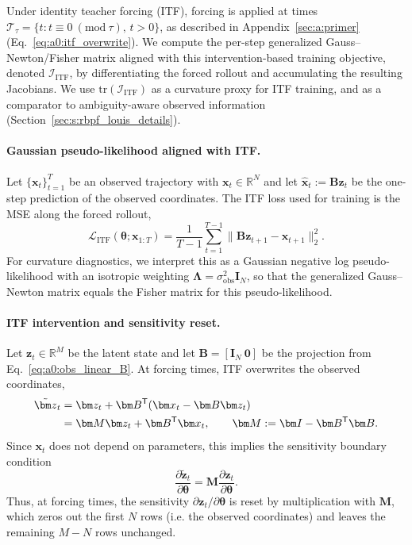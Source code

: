 \documentclass[twoside]{article}
\theoremstyle{plain}
\theoremstyle{definition}
\theoremstyle{remark}
\newcommand{\tr}{\mathrm{tr}}
\begin{document}
Under identity teacher forcing (ITF), forcing is applied at times $\mathcal T_\tau=\{t:t\equiv 0\ (\mathrm{mod}\ \tau),\,t>0\}$, as described in Appendix~\ref{sec:a:primer} (Eq.~\eqref{eq:a0:itf_overwrite}). We compute the per-step generalized Gauss--Newton/Fisher matrix aligned with this intervention-based training objective, denoted $\bm{\mathcal{I}}_{\mathrm{ITF}}$, by differentiating the forced rollout and accumulating the resulting Jacobians. We use $\tr(\bm{\mathcal{I}}_{\mathrm{ITF}})$ as a curvature proxy for ITF training, and as a comparator to ambiguity-aware observed information (Section~\ref{sec:s:rbpf_louis_details}).

\paragraph{Gaussian pseudo-likelihood aligned with ITF.}
Let $\{\bm{x}_t\}_{t=1}^{T}$ be an observed trajectory with $\bm{x}_t\in\mathbb{R}^N$ and let $\hat{\bm x}_t:=\bm B\bm z_t$ be the one-step prediction of the observed coordinates. The ITF loss used for training is the MSE along the forced rollout,
\begin{equation}
\label{eq:a:tf_loss}
\mathcal{L}_{\mathrm{ITF}}(\bm\theta;\bm{x}_{1:T})
= \frac{1}{T-1}\sum_{t=1}^{T-1}\big\|\bm{B}\bm{z}_{t+1}-\bm{x}_{t+1}\big\|_2^2.
\end{equation}
For curvature diagnostics, we interpret this as a Gaussian negative log pseudo-likelihood with an isotropic weighting $\bm\Lambda=\sigma_{\mathrm{obs}}^2\bm I_N$, so that the generalized Gauss--Newton matrix equals the Fisher matrix for this pseudo-likelihood.

\paragraph{ITF intervention and sensitivity reset.}
Let $\bm{z}_t\in\mathbb{R}^M$ be the latent state and let $\bm B=[\bm I_N\ \bm 0]$ be the projection from Eq.~\eqref{eq:a0:obs_linear_B}. At forcing times, ITF overwrites the observed coordinates,
\begin{align}
\tilde{\bm z}_t
&=\bm z_t+\bm B^{\mathsf T}(\bm x_t-\bm B\bm z_t)\notag\\
&=\bm M\bm z_t+\bm B^{\mathsf T}\bm x_t,\qquad
\bm M:=\bm I-\bm B^{\mathsf T}\bm B.
\end{align}
Since $\bm x_t$ does not depend on parameters, this implies the sensitivity boundary condition
\begin{equation}
\frac{\partial\tilde{\bm z}_t}{\partial\bm\theta}=\bm M\frac{\partial\bm z_t}{\partial\bm\theta}.
\end{equation}
Thus, at forcing times, the sensitivity $\partial \bm{z}_t/\partial \bm\theta$ is reset by multiplication with $\bm M$, which zeros out the first $N$ rows (i.e. the observed coordinates) and leaves the remaining $M-N$ rows unchanged.
\end{document}
